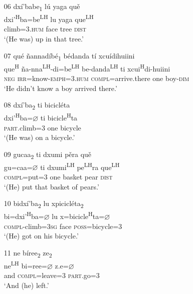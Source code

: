 \begin{itemize}
\item[06]
\glll dx\'{i}'babe\textsubscript{1} l\'{u} yaga qu\v{e} \\
dxi'\textsuperscript{H}ba=be\textsuperscript{LH}  lu yaga que\textsuperscript{LH} \\
climb=\textsc{3.hum} face tree \textsc{dist} \\
\glt `(He was) up in that tree.'


\item[07]
\glll qu\'{e} \~{n}annad\'{i}b\'{e}\textsubscript{1} b\'{e}danda t\'{i} xcu\'{i}dihuiini \\
que\textsuperscript{H} \~{n}a-nna\textsuperscript{LH}-di=be\textsuperscript{LH}  be-danda\textsuperscript{LH} ti xcui\textsuperscript{H}di-huiini \\
\textsc{neg} \textsc{irr}=know-\textsc{emph}=\textsc{3.hum} \textsc{compl}=arrive.there one boy-\textsc{dim} \\
\glt `He didn't know a boy arrived there.'
 

\item[08]
\glll dx\'{i}'ba\textsubscript{2} ti bicicl\'{e}ta  \\
dxi'\textsuperscript{H}ba={$\varnothing$} ti bicicle\textsuperscript{H}ta  \\
\textsc{part}.climb=\textsc{3} one bicycle  \\
\glt `(He was) on a bicycle.'


\item[09]
\glll gucaa\textsubscript{2} ti dxumi p\v{e}ra qu\v{e} \\
gu=caa={$\varnothing$} ti dxumi\textsuperscript{LH} pe\textsuperscript{LH}ra que\textsuperscript{LH} \\
\textsc{compl}=put=\textsc{3} one basket pear \textsc{dist} \\
\glt `(He) put that basket of pears.'


\item[10]
\glll bidx\'{i}'ba\textsubscript{2} lu xpicicl\'{e}ta\textsubscript{2} \\
bi=dxi'\textsuperscript{H}ba={$\varnothing$} lu x=bicicle\textsuperscript{H}ta={$\varnothing$}  \\
\textsc{compl}-climb=\textsc{3sg} face \textsc{poss}=bicycle=\textsc{3} \\
\glt `(He) got on his bicycle.'

 
 \item[11]
\glll ne b\'{i}ree\textsubscript{2} ze\textsubscript{2} \\
ne\textsuperscript{LH} bi=ree={$\varnothing$} z.e={$\varnothing$} \\
and \textsc{compl}=leave=\textsc{3} \textsc{part}.go=\textsc{3} \\
\glt `And (he) left.'



\end{itemize}

